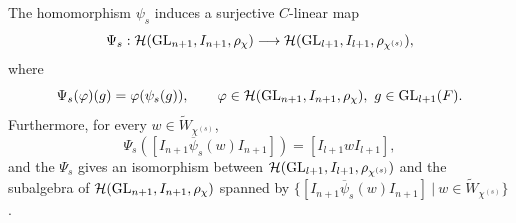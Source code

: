     \begin{proposition}\label{prop_algebrahom}
        The homomorphism $\psi_s$ induces a surjective $C$-linear map
        \begin{equation*}
            \Psi_s:\mathcal{H}(\mathrm{GL}_{n+1},I_{n+1},\rho_\chi)\longrightarrow\mathcal{H}(\mathrm{GL}_{l+1},I_{l+1},\rho_{\chi^{(s)}}),
        \end{equation*}
        where
        $$\Psi_s(\varphi)(g)=\varphi(\psi_s(g)),\quad\quad \varphi\in\mathcal{H}(\mathrm{GL}_{n+1},I_{n+1},\rho_\chi),\ g\in\mathrm{GL}_{l+1}(F).$$
        Furthermore, for every $w\in\widetilde{W}_{\chi^{(s)}}$,
        $$\Psi_s([I_{n+1}\overline{\psi}_s(w)I_{n+1}])=[I_{l+1}wI_{l+1}],$$
        and the $\Psi_s$ gives an isomorphism between $\mathcal{H}(\mathrm{GL}_{l+1},I_{l+1},\rho_{\chi^{(s)}})$ and the subalgebra of $\mathcal{H}(\mathrm{GL}_{n+1},I_{n+1},\rho_\chi)$ spanned by $\{[I_{n+1}\overline{\psi}_s(w)I_{n+1}]\ |\ w\in \widetilde{W}_{\chi^{(s)}}\}$.
    \end{proposition}
